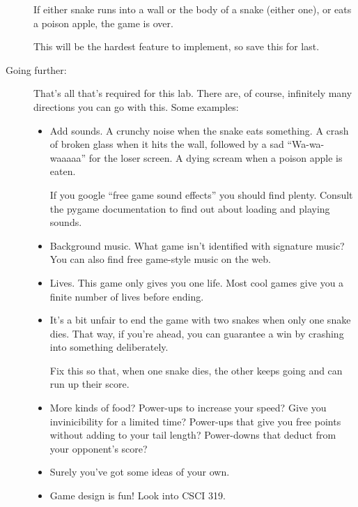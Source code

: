 \documentclass[12pt]{article}
\begin{document}
\begin{description}
If either snake runs into a wall or the body of a snake
(either one), or eats a poison apple, the game is over.

This will be the hardest feature to implement, so save
this for last.

\item[Going further:]  That's all that's required for this lab.
There are, of course, infinitely many directions you can go
with this.  Some examples:
\begin{itemize}
\item Add sounds.  A crunchy noise when the snake eats something.
A crash of broken glass when it hits the wall, followed by
a sad ``Wa-wa-waaaaa'' for the loser screen.  A dying scream
when a poison apple is eaten.

If you google ``free game sound effects'' you should find plenty.
Consult the pygame documentation to find out about loading and 
playing sounds.

\item Background music.  What game isn't identified with signature
music?  You can also find free game-style music on the web.

\item Lives.  This game only gives you one life.  Most cool
games give you a finite number of lives before ending.

\item It's a bit unfair to end the game with two snakes when
only one snake dies.  That way, if you're ahead, you can 
guarantee a win by crashing into something deliberately.

Fix this so that, when one snake dies, the other keeps going
and can run up their score.

\item More kinds of food?  Power-ups to increase your speed?
Give you invinicibility for a limited time?  Power-ups that give
you free points without adding to your tail length?  Power-downs
that deduct from your opponent's score?

\item Surely you've got some ideas of your own. 

\item Game design is fun!
Look into CSCI 319.
\end{itemize}




\end{description}
\end{document}
